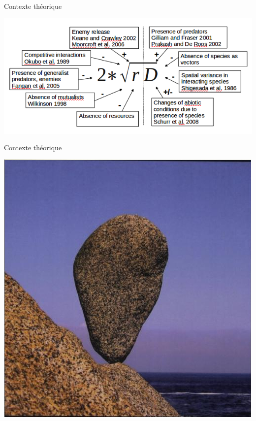 \documentclass{eecslides}
\begin{document}
	\begin{frame}{Contexte théorique}
		\begin{center}
		\includegraphics[height=0.6\textheight]{svenning}\\
		\end{center}
	\end{frame}


	\begin{frame}{Contexte théorique}
		\begin{center}
		\includegraphics[height=0.6\textheight]{scheffer}\\
		\end{center}
	\end{frame}
\end{document}
